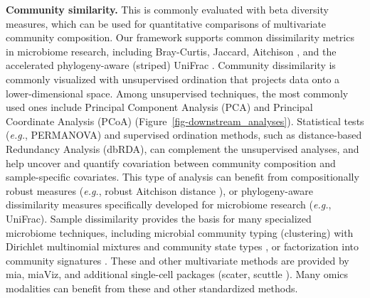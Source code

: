 \documentclass[
  sn-nature,
]{sn-jnl}
\begin{document}
\textbf{Community similarity.} This is commonly evaluated with beta
diversity measures, which can be used for quantitative comparisons of
multivariate community composition. Our framework supports common
dissimilarity metrics in microbiome research, including Bray-Curtis,
Jaccard, Aitchison \citep{bastiaanssen2023_1}, and the accelerated
phylogeny-aware (striped) UniFrac \citep{mcdonald2018}. Community
dissimilarity is commonly visualized with unsupervised ordination that
projects data onto a lower-dimensional space. Among unsupervised
techniques, the most commonly used ones include Principal Component
Analysis (PCA) and Principal Coordinate Analysis (PCoA)
(Figure~\ref{fig-downstream_analyses}). Statistical tests (\emph{e.g.},
PERMANOVA) and supervised ordination methods, such as distance-based
Redundancy Analysis (dbRDA), can complement the unsupervised analyses,
and help uncover and quantify covariation between community composition
and sample-specific covariates. This type of analysis can benefit from
compositionally robust measures (\emph{e.g.}, robust Aitchison distance
\citep{martino2019}), or phylogeny-aware dissimilarity measures
specifically developed for microbiome research (\emph{e.g.}, UniFrac).
Sample dissimilarity provides the basis for many specialized microbiome
techniques, including microbial community typing (clustering) with
Dirichlet multinomial mixtures \citep{holmes2012} and community state
types \citep{digiulio2015}, or factorization into community signatures
\citep{frioux2023, lindgren2026}. These and other multivariate methods
are provided by mia, miaViz, and additional single-cell packages
(scater, scuttle \citep{amezquita2020}). Many omics modalities can
benefit from these and other standardized methods.
\end{document}

